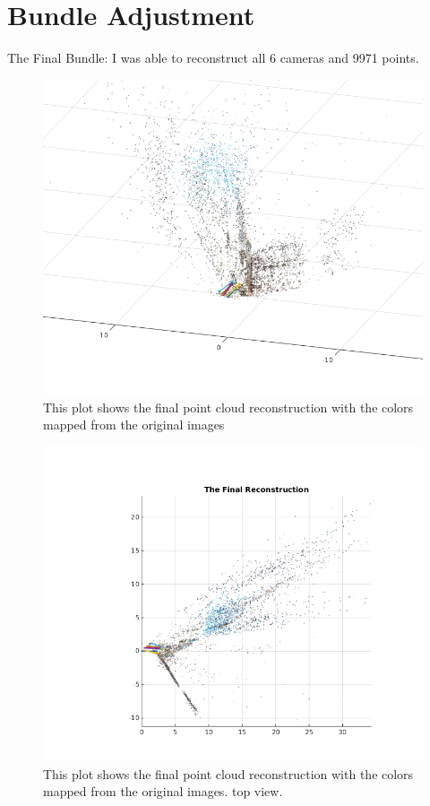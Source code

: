 \documentclass{article}
\begin{document}
\section{Bundle Adjustment}
The Final Bundle:
I was able to reconstruct all 6 cameras and 9971 points.
\begin{figure}[!h]
\includegraphics[width = \textwidth]{final_back.png}
\centering
\caption{This plot shows the final point cloud reconstruction with the colors mapped from the original images}
\end{figure}

\begin{figure}[!h]
\includegraphics[width = \textwidth]{final_top.png}
\centering
\caption{This plot shows the final point cloud reconstruction with the colors mapped from the original images. top view.}
\end{figure}
\end{document}
